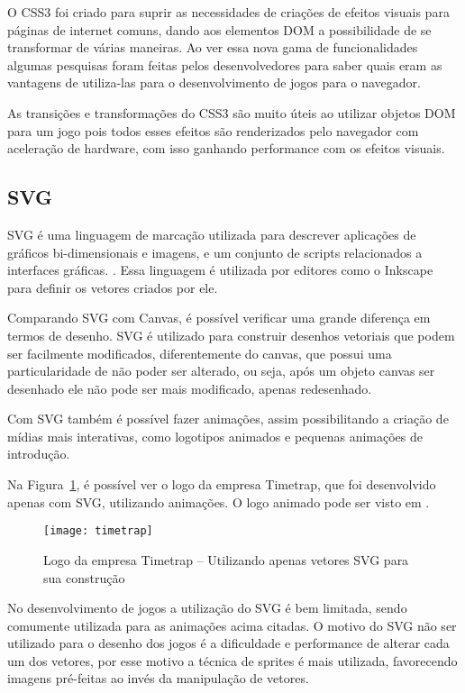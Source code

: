 O CSS3 foi criado para suprir as necessidades de criações de efeitos
visuais para páginas de internet comuns, dando aos elementos DOM a
possibilidade de se transformar de várias maneiras. Ao ver essa nova
gama de funcionalidades algumas pesquisas foram feitas pelos
desenvolvedores para saber quais eram as vantagens de utiliza-las para
o desenvolvimento de jogos para o navegador.

As transições e transformações do CSS3 são muito úteis ao utilizar
objetos DOM para um jogo pois todos esses efeitos são renderizados
pelo navegador com aceleração de hardware, com isso ganhando
performance com os efeitos visuais.

\subsection{SVG}

SVG é uma linguagem de marcação utilizada para descrever aplicações de gráficos
bi-dimensionais e imagens, e um conjunto de scripts relacionados a
interfaces gráficas. \cite{website:w3csvg}. Essa linguagem é utilizada por
editores como o Inkscape para definir os vetores criados por ele.

Comparando SVG com Canvas, é possível verificar uma grande diferença
em termos de desenho. SVG é utilizado para construir desenhos
vetoriais que podem ser facilmente modificados, diferentemente do
canvas, que possui uma particularidade de não poder ser alterado, ou
seja, após um objeto canvas ser desenhado ele não pode ser mais
modificado, apenas redesenhado.

Com SVG também é possível fazer animações, assim possibilitando a
criação de mídias mais interativas, como logotipos animados e pequenas
animações de introdução.

Na Figura~\ref{img:timetrap}, é possível ver o logo da empresa
Timetrap, que foi desenvolvido apenas com SVG, utilizando animações. O
logo animado pode ser visto em .

\begin{figure}[H]
  \centering
	\texttt{[image: timetrap]}
  \caption{Logo da empresa Timetrap {--} Utilizando apenas vetores SVG para sua construção}
  \label{img:timetrap}
\end{figure}

No desenvolvimento de jogos a utilização do SVG é bem limitada, sendo
comumente utilizada para as animações acima citadas. O motivo do SVG
não ser utilizado para o desenho dos jogos é a dificuldade e
performance de alterar cada um dos vetores, por esse motivo
a técnica de sprites é mais utilizada, favorecendo imagens pré-feitas
ao invés da manipulação de vetores.


